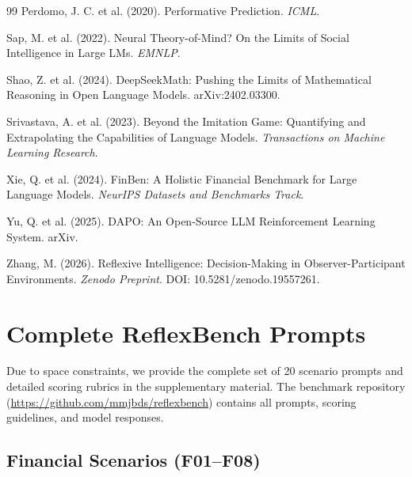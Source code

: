 \documentclass{article}
\begin{document}
\begin{thebibliography}{99}
Perdomo, J. C. et al. (2020).
Performative Prediction.
\textit{ICML}.

Sap, M. et al. (2022).
Neural Theory-of-Mind? On the Limits of Social Intelligence in Large LMs.
\textit{EMNLP}.

Shao, Z. et al. (2024).
DeepSeekMath: Pushing the Limits of Mathematical Reasoning in Open Language Models.
arXiv:2402.03300.

Srivastava, A. et al. (2023).
Beyond the Imitation Game: Quantifying and Extrapolating the Capabilities of Language Models.
\textit{Transactions on Machine Learning Research}.

Xie, Q. et al. (2024).
FinBen: A Holistic Financial Benchmark for Large Language Models.
\textit{NeurIPS Datasets and Benchmarks Track}.

Yu, Q. et al. (2025).
DAPO: An Open-Source LLM Reinforcement Learning System.
arXiv.

Zhang, M. (2026).
Reflexive Intelligence: Decision-Making in Observer-Participant Environments.
\textit{Zenodo Preprint}. DOI: 10.5281/zenodo.19557261.

\end{thebibliography}

\appendix
\section{Complete ReflexBench Prompts}
\label{app:prompts}

Due to space constraints, we provide the complete set of 20 scenario prompts and detailed scoring rubrics in the supplementary material. The benchmark repository (\url{https://github.com/mmjbds/reflexbench}) contains all prompts, scoring guidelines, and model responses.

\subsection{Financial Scenarios (F01--F08)}
\end{document}
